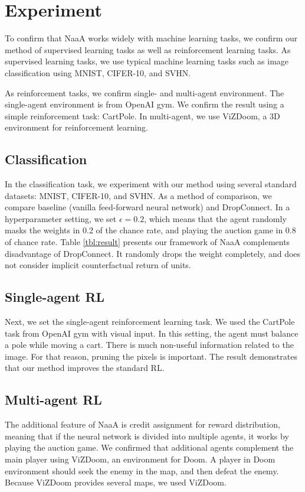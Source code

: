 \section{Experiment}
To confirm that NaaA works widely with machine learning tasks,
we confirm our method of supervised learning tasks as well as reinforcement learning tasks.
As supervised learning tasks, we use typical machine learning tasks such as image classification
using MNIST, CIFER-10, and SVHN.

As reinforcement tasks, we confirm single- and multi-agent environment.
The single-agent environment is from OpenAI gym.
We confirm the result using a simple reinforcement task: CartPole.
In multi-agent, we use ViZDoom, a 3D environment for reinforcement learning.

\subsection{Classification}
In the classification task, we experiment with our method using several standard datasets: MNIST, CIFER-10, and SVHN.
As a method of comparison, we compare baseline (vanilla feed-forward neural network) and DropConnect.
In a hyperparameter setting, we set $\epsilon = 0.2$, which means that the agent randomly masks the weights in 0.2 of the chance rate, 
and playing the auction game in 0.8 of chance rate.
Table \ref{tbl:result} presents our framework of NaaA complements disadvantage of DropConnect.
It randomly drops the weight completely, and does not consider implicit counterfactual return of units.

\subsection{Single-agent RL}
Next, we set the single-agent reinforcement learning task.
We used the CartPole task from OpenAI gym with visual input.
In this setting, the agent must balance a pole while moving a cart.
There is much non-useful information related to the image. For that reason, pruning the pixels is important.
The result demonstrates that our method improves the standard RL.

\subsection{Multi-agent RL}
The additional feature of NaaA is credit assignment for reward distribution, 
meaning that if the neural network is divided into multiple agents, it works by playing the auction game.
We confirmed that additional agents complement the main player using ViZDoom, an environment for Doom.
A player in Doom environment should seek the enemy in the map, and then defeat the enemy.
Because ViZDoom provides several maps, we used ViZDoom.

